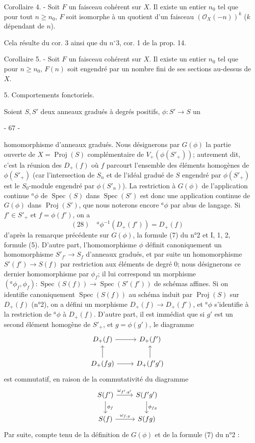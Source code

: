 Corollaire 4. - Soit $F$ un faisceau cohérent sur $X$. Il existe un entier $n_0$ tel que pour tout $n \ge n_0$, $F$ soit isomorphe à un quotient d'un faisceau $(\mathcal{O}_X(-n))^k$ ($k$ dépendant de $n$).

Cela résulte du cor. 3 ainsi que du $n^\circ 3$, cor. 1 de la prop. 14.

Corollaire 5. - Soit $F$ un faisceau cohérent sur $X$. Il existe un entier $n_0$ tel que pour $n \ge n_0$, $F(n)$ soit engendré par un nombre fini de ses sections au-dessus de $X$.

5. Comportements fonctoriels.

Soient $S, S'$ deux anneaux gradués à degrés positifs, $\phi : S' \to S$ un

\newpage


- 67 -


homomorphisme d'anneaux gradués. Nous désignerons par $G(\phi)$ la partie ouverte de $X = \operatorname{Proj}(S)$ complémentaire de $V_+(\phi(S'_+))$; autrement dit, c'est la réunion des $D_+(f)$ où $f$ parcourt l'ensemble des éléments homogènes de $\phi(S'_+)$ (car l'intersection de $S_n$ et de l'idéal gradué de $S$ engendré par $\phi(S'_+)$ est le $S_0$-module engendré par $\phi(S'_n)$). La restriction à $G(\phi)$ de l'application continue ${}^a\phi$ de $\operatorname{Spec}(S)$ dans $\operatorname{Spec}(S')$ est donc une application continue de $G(\phi)$ dans $\operatorname{Proj}(S')$, que nous noterons encore ${}^a\phi$ par abus de langage. Si $f' \in S'_+$ et $f = \phi(f')$, on a
$$(28) \quad {}^a\phi^{-1}(D_+(f')) = D_+(f)$$
d'après la remarque précédente sur $G(\phi)$, la formule (7) du n°2 et I, 1, 2, formule (5). D'autre part, l'homomorphisme $\phi$ définit canoniquement un homomorphisme $S'_{f'} \to S_f$ d'anneaux gradués, et par suite un homomorphisme $S'(f') \to S(f)$ par restriction aux éléments de degré 0; nous désignerons ce dernier homomorphisme par $\phi_f$; il lui correspond un morphisme $({}^a\phi_f, \phi_f) : \operatorname{Spec}(S(f)) \to \operatorname{Spec}(S'(f'))$ de schémas affines. Si on identifie canoniquement $\operatorname{Spec}(S(f))$ au schéma induit par $\operatorname{Proj}(S)$ sur $D_+(f)$ (n°2), on a défini un morphisme $D_+(f) \to D_+(f')$, et ${}^a\phi$ s'identifie à la restriction de ${}^a\phi$ à $D_+(f)$. D'autre part, il est immédiat que si $g'$ est un second élément homogène de $S'_+$, et $g = \phi(g')$, le diagramme
$$\begin{tikzcd}
D_+(f) \arrow[r] & D_+(f') \\
D_+(fg) \arrow[u] \arrow[r] & D_+(f'g') \arrow[u]
\end{tikzcd}$$
est commutatif, en raison de la commutativité du diagramme
$$\begin{tikzcd}
S(f') \arrow[d, "\phi_f"] \arrow[r, "\omega_{f', g'}"] & S(f'g') \arrow[d, "\phi_{fg}"] \\
S(f) \arrow[r, "\omega_{f, g}"] & S(fg)
\end{tikzcd}$$
Par suite, compte tenu de la définition de $G(\phi)$ et de la formule (7) du n°2 :

